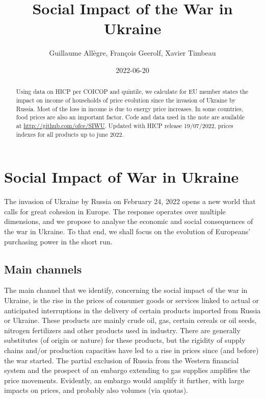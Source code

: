 \documentclass[
  9pt,
  a4paper,
  numbers=noendperiod,
  DIV=12]{scrartcl}
\title{Social Impact of the War in Ukraine}
\author{Guillaume Allègre, François Geerolf, Xavier Timbeau}
\date{2022-06-20}
\renewcommand*\contentsname{Table of contents}
\newcommand\contentsname{Table of contents}
\begin{document}
\maketitle
\begin{abstract}
Using data on HICP per COICOP and quintile, we calculate for EU member
states the impact on income of households of price evolution since the
invasion of Ukraine by Russia. Most of the loss in income is due to
energy price increases. In some countries, food prices are also an
important factor. Code and data used in the note are available at
\url{http://github.com/ofce/SIWU}. Updated with HICP release 19/07/2022,
prices indexes for all products up to june 2022.
\end{abstract}
\ifdefined\Shaded\renewenvironment{Shaded}{\begin{tcolorbox}[interior hidden, frame hidden, sharp corners, borderline west={3pt}{0pt}{shadecolor}, enhanced, breakable, boxrule=0pt]}{\end{tcolorbox}}\fi

\renewcommand*\contentsname{Table of contents}
{
\hypersetup{linkcolor=}
\setcounter{tocdepth}{1}
\tableofcontents
}
\hypertarget{social-impact-of-war-in-ukraine}{%
\section{Social Impact of War in
Ukraine}\label{social-impact-of-war-in-ukraine}}

The invasion of Ukraine by Russia on February 24, 2022 opens a new world
that calls for great cohesion in Europe. The response operates over
multiple dimensions, and we propose to analyse the economic and social
consequences of the war in Ukraine. To that end, we shall focus on the
evolution of Europeans' purchasing power in the short run.

\hypertarget{main-channels}{%
\subsection{Main channels}\label{main-channels}}

The main channel that we identify, concerning the social impact of the
war in Ukraine, is the rise in the prices of consumer goods or services
linked to actual or anticipated interruptions in the delivery of certain
products imported from Russia or Ukraine. These products are mainly
crude oil, gas, certain cereals or oil seeds, nitrogen fertilizers and
other products used in industry. There are generally substitutes (of
origin or nature) for these products, but the rigidity of supply chains
and/or production capacities have led to a rise in prices since (and
before) the war started. The partial exclusion of Russia from the
Western financial system and the prospect of an embargo extending to gas
supplies amplifies the price movements. Evidently, an embargo would
amplify it further, with large impacts on prices, and probably also
volumes (via quotas).
\end{document}
